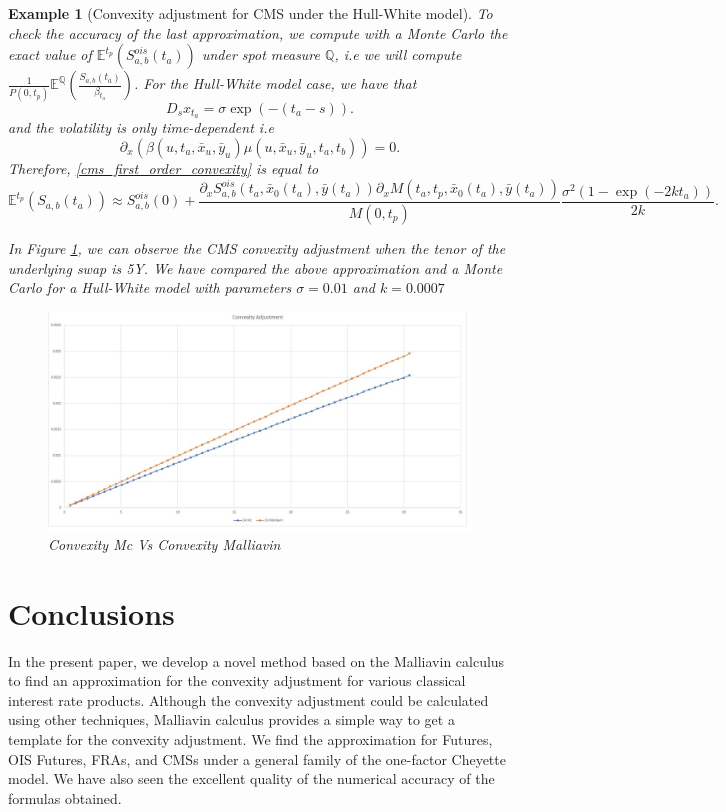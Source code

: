 \documentclass[a4paper,10pt]{article}
\newtheorem{example}[theorem]{Example}
\newcommand{\1}{\mathbf{1}}
\begin{document}
\begin{example}[Convexity adjustment for CMS under the Hull-White model]
To check the accuracy of the last approximation, we compute with a Monte Carlo the exact value of $\mathbb{E}^{t_p}\left(S^{ois}_{a,b}(t_a)\right)$ under spot measure $\mathbb{Q}$, i.e we will compute  $\frac{1}{P(0,t_p)}  \mathbb{E}^{\mathbb{Q}}\left(\frac{S_{a,b}(t_a)}{\beta_{t_a}} \right)$. For the Hull-White model case, we have that
\begin{equation*}
D_s x_{t_a} = \sigma \exp(-(t_a - s)).
\end{equation*}
and the volatility is only time-dependent i.e 
$$
\partial_x (\beta(u,t_a,\bar{x}_u,\bar{y}_u) \mu(u,\bar{x}_u, \bar{y}_u,t_a,t_b)) = 0.
$$
Therefore, \eqref{cms_first_order_convexity} is equal to
\begin{equation*}
\mathbb{E}^{t_p}\left(S_{a,b}(t_a)\right) \approx  S^{ois}_{a,b}(0) + \frac{\partial_x S^{ois}_{a,b}(t_a, \bar{x}_0(t_a),\bar{y}(t_a))\partial_x M(t_a,t_p, \bar{x}_0(t_a),\bar{y}(t_a))}{M(0,t_p)} \frac{\sigma^{2}(1-\exp(-2kt_a))}{2k}.
\end{equation*}

In Figure \ref{fig:CMS}, we can observe the CMS convexity adjustment when the tenor of the underlying swap is 5Y. We have compared the above approximation and a Monte Carlo for a Hull-White model with parameters $\sigma=0.01$ and $k=0.0007$

\begin{figure}[H]
	\begin{center}
		\includegraphics[scale=0.25]{Figures/cms_convexity_order.jpg}
	\end{center}
	\caption{Convexity Mc Vs Convexity Malliavin}
	\label{fig:CMS}
\end{figure} 
\end{example}


\section{Conclusions}\label{sec:Conclusion}
In the present paper, we develop a novel method based on the Malliavin calculus to find an approximation for the convexity adjustment for various classical interest rate products. Although the convexity adjustment could be calculated using other techniques, Malliavin calculus provides a simple way to get a template for the convexity adjustment. We find the approximation for Futures, OIS Futures, FRAs, and CMSs under a general family of the one-factor Cheyette model. We have also seen the excellent quality of the numerical accuracy of the formulas obtained.
\end{document}

